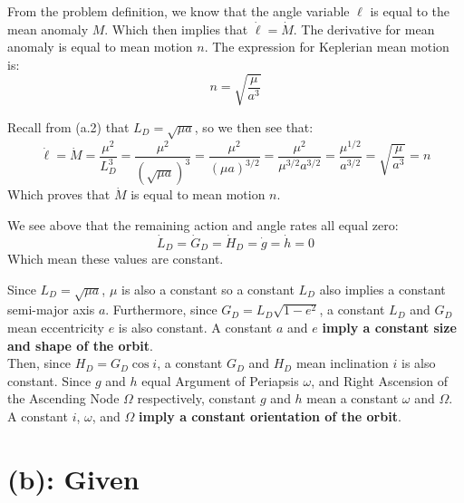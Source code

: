 \documentclass[titlepage]{article}
\begin{document}
From the problem definition, we know that the angle variable $\ell$ is equal to the mean anomaly $M$. Which then implies that $\dot{\ell}=\dot{M}$. The derivative for mean anomaly is equal to mean motion $n$. The expression for Keplerian mean motion is:
\begin{equation}
	n=\sqrt{\frac{\mu}{a^3}}
\end{equation}

\begin{mdframed}[linewidth=1pt, innertopmargin=10pt, innerbottommargin=10pt]
	Recall from (a.2) that $L_D=\sqrt{\mu a}$, so we then see that:
	\begin{equation}
		\dot{\ell}=\dot{M}=\frac{\mu^2}{L_D^3}=\frac{\mu^2}{\left(\sqrt{\mu a}\right)^3}=\frac{\mu^2}{\left(\mu a\right)^{3/2}}=\frac{\mu^2}{\mu^{3/2}a^{3/2}}=\frac{\mu^{1/2}}{a^{3/2}}=\sqrt{\frac{\mu}{a^3}}=n
	\end{equation}
	Which proves that $\dot{M}$ is equal to mean motion $n$.
\end{mdframed}

\newpage

\begin{mdframed}[linewidth=1pt, innertopmargin=10pt, innerbottommargin=10pt]
	We see above that the remaining action and angle rates all equal zero:
	\begin{equation}
		\dot{L}_D=\dot{G}_D=\dot{H}_D=\dot{g}=\dot{h}=0
	\end{equation}
	Which mean these values are constant.
	
	Since $L_D=\sqrt{\mu a}$, $\mu$ is also a constant so a constant $L_D$ also implies a constant semi-major axis $a$. Furthermore, since $G_D=L_D\sqrt{1-e^2}$, a constant $L_D$ and $G_D$ mean eccentricity $e$ is also constant. A constant $a$ and $e$ \textbf{imply a constant size and shape of the orbit}.\\
	
	Then, since $H_D=G_D\cos i$, a constant $G_D$ and $H_D$ mean inclination $i$ is also constant. Since $g$ and $h$ equal Argument of Periapsis $\omega$, and Right Ascension of the Ascending Node $\Omega$ respectively, constant $g$ and $h$ mean a constant $\omega$ and $\Omega$. A constant $i$, $\omega$, and $\Omega$ \textbf{imply a constant orientation of the orbit}.
\end{mdframed}

\newpage

\section*{(b): Given}
\end{document}
